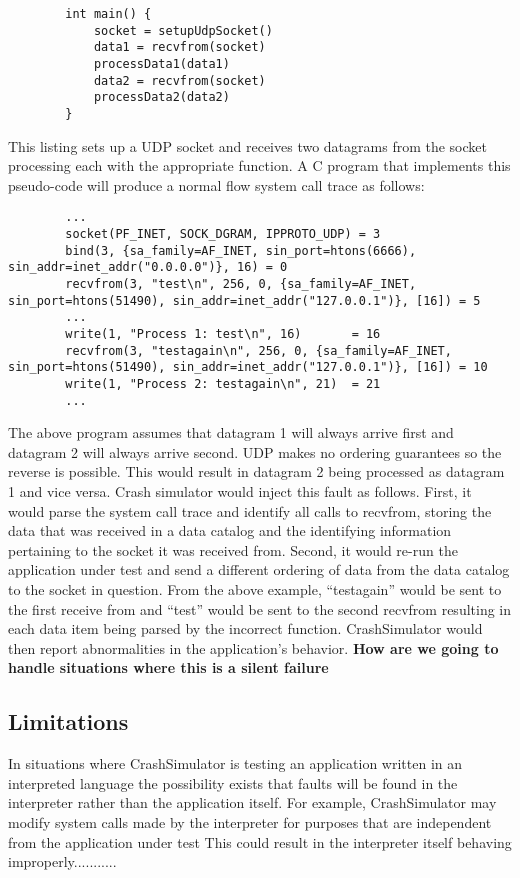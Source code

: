     \begin{verbatim}
        int main() {
            socket = setupUdpSocket()
            data1 = recvfrom(socket)
            processData1(data1)
            data2 = recvfrom(socket)
            processData2(data2)
        }
    \end{verbatim}

    This listing sets up a UDP socket and receives two datagrams from the socket processing each with the appropriate
    function. A C program that implements this pseudo-code will produce a normal flow system call trace as follows:

    \begin{verbatim}
        ...
        socket(PF_INET, SOCK_DGRAM, IPPROTO_UDP) = 3
        bind(3, {sa_family=AF_INET, sin_port=htons(6666), sin_addr=inet_addr("0.0.0.0")}, 16) = 0
        recvfrom(3, "test\n", 256, 0, {sa_family=AF_INET, sin_port=htons(51490), sin_addr=inet_addr("127.0.0.1")}, [16]) = 5
        ...
        write(1, "Process 1: test\n", 16)       = 16
        recvfrom(3, "testagain\n", 256, 0, {sa_family=AF_INET, sin_port=htons(51490), sin_addr=inet_addr("127.0.0.1")}, [16]) = 10
        write(1, "Process 2: testagain\n", 21)  = 21
        ...
    \end{verbatim}

    The above program assumes that datagram 1 will always arrive first and datagram 2 will always arrive second. UDP
    makes no ordering guarantees so the reverse is possible. This would result in datagram 2 being processed as datagram
    1 and vice versa. Crash simulator would inject this fault as follows. First, it would parse the system call trace
    and identify all calls to recvfrom, storing the data that was received in a data catalog and the identifying
    information pertaining to the socket it was received from. Second, it would re-run the application under test and
    send a different ordering of data from the data catalog to the socket in question. From the above example,
    ``testagain'' would be sent to the first receive from and ``test'' would be sent to the second recvfrom resulting in
    each data item being parsed by the incorrect function. CrashSimulator would then report abnormalities in the
    application's behavior. \textbf{How are we going to handle situations where this is a silent failure}

    \subsection{Limitations}

    In situations where CrashSimulator is testing an application written in an interpreted language the possibility
    exists that faults will be found in the interpreter rather than the application itself. For example, CrashSimulator
    may modify system calls made by the interpreter for purposes that are independent from the application under test
    This could result in the interpreter itself behaving improperly...........
